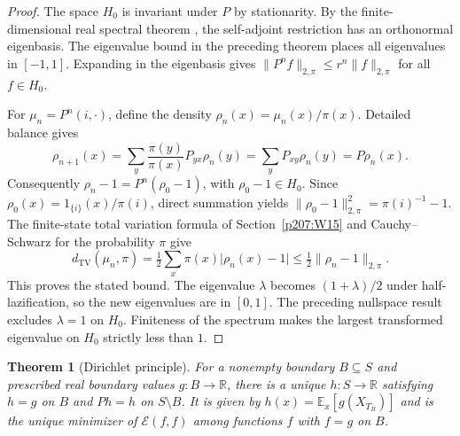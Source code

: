 \documentclass[11pt,oneside,openany]{book}
\theoremstyle{plain}
\newtheorem{theorem}{Theorem}[chapter]
\theoremstyle{definition}
\theoremstyle{remark}
\begin{document}
\begin{proof}
The space \(H_0\) is invariant under \(P\) by stationarity. By the
finite-dimensional real spectral theorem
\cite[The Real Spectral Theorem]{D05}, the self-adjoint restriction
has an orthonormal eigenbasis. The eigenvalue bound in the preceding
theorem places all eigenvalues in \([-1,1]\). Expanding in the
eigenbasis gives
\(\lVert P^n f\rVert_{2,\pi}\leq r^n\lVert f\rVert_{2,\pi}\)
for all \(f\in H_0\).

For \(\mu_n=P^n(i,\cdot)\), define the density
\(\rho_n(x)=\mu_n(x)/\pi(x)\). Detailed balance gives
\[
 \rho_{n+1}(x)=\sum_y \frac{\pi(y)}{\pi(x)} P_{yx}\rho_n(y)
             =\sum_y P_{xy}\rho_n(y)=P\rho_n(x).
\]
Consequently \(\rho_n-1=P^n(\rho_0-1)\), with \(\rho_0-1\in H_0\).
Since \(\rho_0(x)=1_{\{i\}}(x)/\pi(i)\), direct summation yields
\(\lVert \rho_0-1\rVert_{2,\pi}^2=\pi(i)^{-1}-1\).
The finite-state total variation formula of Section~\ref{p207:W15}
and Cauchy--Schwarz for the probability \(\pi\) give
\[
 d_{\mathrm{TV}}(\mu_n,\pi)
  =\tfrac12\sum_x\pi(x)\lvert \rho_n(x)-1\rvert
  \leq\tfrac12\lVert \rho_n-1\rVert_{2,\pi}.
\]
This proves the stated bound. The eigenvalue \(\lambda\) becomes
\((1+\lambda)/2\) under half-lazification, so the new eigenvalues
are in \([0,1]\). The preceding nullspace result excludes
\(\lambda=1\) on \(H_0\). Finiteness of the spectrum makes the
largest transformed eigenvalue on \(H_0\) strictly less than \(1\).
\end{proof}

\begin{theorem}[Dirichlet principle]\label{p207:thm:dirichlet-principle}
For a nonempty boundary \(B\subseteq S\) and prescribed real boundary
values \(g:B\to\mathbb R\), there is a unique \(h:S\to\mathbb R\)
satisfying \(h=g\) on \(B\) and \(Ph=h\) on \(S\setminus B\).
It is given by \(h(x)=\mathbb E_x[g(X_{T_B})]\) and is the unique
minimizer of \(\mathcal E(f,f)\) among functions \(f\) with \(f=g\)
on \(B\).
\end{theorem}
\end{document}
